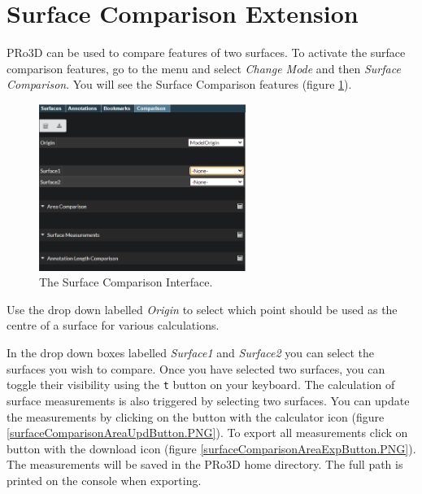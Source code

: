 \section{Surface Comparison Extension}

PRo3D can be used to compare features of two surfaces. To activate the surface comparison features, go to the menu and select \emph{Change Mode} and then \emph{Surface Comparison}. You will see the Surface Comparison features (figure  \ref{fig:surfaceComparison}).


\begin{figure}[h]
	\centering
	\includegraphics[width=0.6\textwidth]{pics/surfaceComparison.PNG}
	\caption[The surface comparison interface.]{The Surface Comparison Interface.}
	\label{fig:surfaceComparison}
\end{figure}

Use the drop down labelled \emph{Origin} to select which point should be used as the centre of a surface for various calculations.

In the drop down boxes labelled \emph{Surface1} and \emph{Surface2} you can select the surfaces you wish to compare. Once you have selected two surfaces, you can toggle their visibility using the \texttt{t} button on your keyboard. The calculation of surface measurements is also triggered by selecting two surfaces. You can update the measurements by clicking on the button with the calculator icon (figure \ref{surfaceComparisonAreaUpdButton.PNG}). To export all measurements click on button with the download icon (figure \ref{surfaceComparisonAreaExpButton.PNG}). The measurements will be saved in the PRo3D home directory. The full path is printed on the console when exporting.

